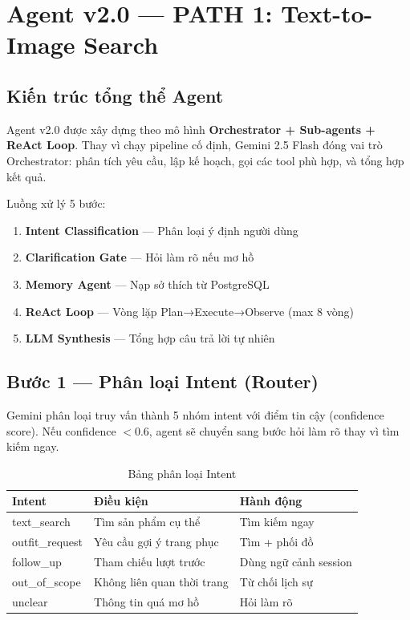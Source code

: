 \documentclass[12pt,a4paper]{report}
\begin{document}
\chapter{Agent v2.0 --- PATH 1: Text-to-Image Search}

\section{Kiến trúc tổng thể Agent}
Agent v2.0 được xây dựng theo mô hình \textbf{Orchestrator + Sub-agents + ReAct Loop}. Thay vì chạy pipeline cố định, Gemini 2.5 Flash đóng vai trò Orchestrator: phân tích yêu cầu, lập kế hoạch, gọi các tool phù hợp, và tổng hợp kết quả.

Luồng xử lý 5 bước:
\begin{enumerate}
    \item \textbf{Intent Classification} --- Phân loại ý định người dùng
    \item \textbf{Clarification Gate} --- Hỏi làm rõ nếu mơ hồ
    \item \textbf{Memory Agent} --- Nạp sở thích từ PostgreSQL
    \item \textbf{ReAct Loop} --- Vòng lặp Plan→Execute→Observe (max 8 vòng)
    \item \textbf{LLM Synthesis} --- Tổng hợp câu trả lời tự nhiên
\end{enumerate}

\section{Bước 1 --- Phân loại Intent (Router)}

\begin{tcolorbox}[title=Phương pháp: LLM Few-shot Intent Classification]
Gemini phân loại truy vấn thành 5 nhóm intent với điểm tin cậy (confidence score). Nếu confidence $< 0.6$, agent sẽ chuyển sang bước hỏi làm rõ thay vì tìm kiếm ngay.
\end{tcolorbox}

\begin{table}[H]
\centering
\begin{tabular}{lll}
\toprule
\textbf{Intent} & \textbf{Điều kiện} & \textbf{Hành động}\\
\midrule
text\_search & Tìm sản phẩm cụ thể & Tìm kiếm ngay\\
outfit\_request & Yêu cầu gợi ý trang phục & Tìm + phối đồ\\
follow\_up & Tham chiếu lượt trước & Dùng ngữ cảnh session\\
out\_of\_scope & Không liên quan thời trang & Từ chối lịch sự\\
unclear & Thông tin quá mơ hồ & Hỏi làm rõ\\
\bottomrule
\end{tabular}
\caption{Bảng phân loại Intent}
\end{table}
\end{document}
